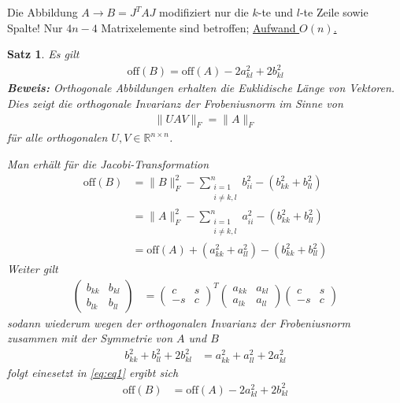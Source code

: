 \documentclass[%
a4paper,
11pt,		%
]
{scrartcl}
\newcommand{\R}{\mathbb{R}}
\newcommand{\off}{\text{off}}
\theoremstyle{plain}
\theoremstyle{plain}
\newtheorem{mysatz}[mydef]{Satz}
\theoremstyle{plain}
\theoremstyle{plain}
\begin{document}
Die Abbildung $A \rightarrow B = J^T A J$ modifiziert nur die $k$-te und $l$-te Zeile sowie Spalte! Nur $4n-4$ Matrixelemente sind betroffen; \uline{Aufwand $O(n)$.}


\begin{mysatz}
Es gilt
\begin{align*}
  \off(B) = \off(A) - 2 a_{kl}^2 + 2b_{kl}^2 
\end{align*}
\textbf{Beweis:}
Orthogonale Abbildungen erhalten die Euklidische Länge von Vektoren. Dies zeigt die orthogonale Invarianz der Frobeniusnorm im Sinne von
\begin{align*}
\|UAV\|_F = \|A\|_F
\end{align*}
für alle orthogonalen $U,V \in \R^{n \times n}$.

Man erhält für die Jacobi-Transformation
\begin{align*}
  \off(B)   & = \|B\|_F^2 - \sum\limits_{\substack{i=1\\ i \neq k,l}}^n b_{ii}^2 - \left( b_{kk}^2 + b_{ll}^2 \right)\\
            & = \|A\|_F^2 - \sum\limits_{\substack{i=1\\ i \neq k,l}}^n a_{ii}^2 - \left( b_{kk}^2 + b_{ll}^2 \right)\\
            & = \off(A) + (a_{kk}^2 + a_{ll}^2) - (b_{kk}^2+b_{ll}^2)\label{eq:eq1}\tag{1}
\end{align*}
Weiter gilt
\begin{align*}
\begin{pmatrix}
b_{kk} & b_{kl}\\
b_{lk} & b_{ll}
\end{pmatrix}
& = 
\begin{pmatrix}
c & s\\
-s & c
\end{pmatrix}^T
\begin{pmatrix}
a_{kk} & a_{kl}\\
a_{lk} & a_{ll}
\end{pmatrix}
\begin{pmatrix}
c & s\\
-s & c
\end{pmatrix}
\end{align*}
sodann wiederum wegen der orthogonalen Invarianz der Frobeniusnorm zusammen mit der Symmetrie von $A$ und $B$
\begin{align*}
b_{kk}^2 + b_{ll}^2 + 2b_{kl}^2 & = a_{kk}^2 + a_{ll}^2 + 2a_{kl}^2
\end{align*}
folgt einesetzt in \eqref{eq:eq1} ergibt sich
\begin{align*}
\off(B) & = \off(A) - 2a_{kl}^2 + 2b_{kl}^2
\end{align*}
\
\end{mysatz}
\end{document}
